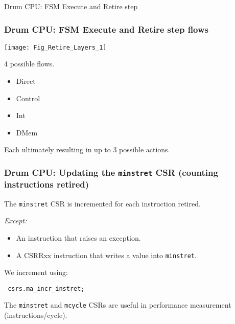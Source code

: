 \begin{frame}[fragile]

\begin{center}
  {\LARGE Drum CPU: FSM Execute and Retire step}
\end{center}

\end{frame}


\begin{frame}[fragile]
\frametitle{Drum CPU: FSM Execute and Retire step flows}

\begin{minipage}{0.75\textwidth}
 \texttt{[image: Fig\_Retire\_Layers\_1]}
\end{minipage}
\hm
\begin{minipage}{0.2\textwidth}
4 possible flows.
\begin{itemize}
 \item Direct
 \item Control
 \item Int
 \item DMem
\end{itemize}

\vspace{2ex}

Each ultimately resulting in up to 3 possible actions.
\end{minipage}

\end{frame}


\begin{frame}[fragile]
\frametitle{Drum CPU: Updating the {\tt minstret} CSR (counting instructions retired)}

\footnotesize

The {\tt minstret} CSR is incremented for each instruction retired.

\emph{Except:}

\begin{itemize}

 \item An instruction that raises an exception.

 \item A CSRRxx instruction that writes a value into {\tt minstret}.

\end{itemize}

\vspace{2ex}

We increment using:
\begin{tabbing}\tt
\hmm  csrs.ma\_incr\_instret;
\end{tabbing}

\vspace{2ex}

The {\tt minstret} and {\tt mcycle} CSRs are useful in performance
measurement (instructions/cycle).

\end{frame}

